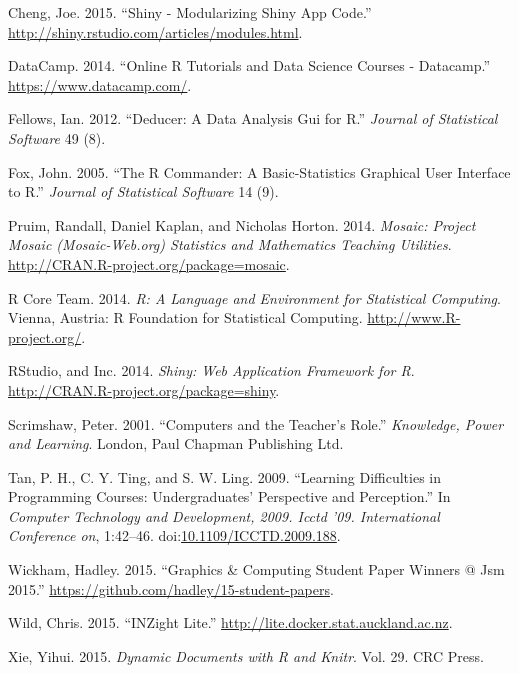 \documentclass[12pt,]{article}
\begin{document}
\hypertarget{ref-shinymodules}{}
Cheng, Joe. 2015. ``Shiny - Modularizing Shiny App Code.''
\url{http://shiny.rstudio.com/articles/modules.html}.

\hypertarget{ref-datacamp}{}
DataCamp. 2014. ``Online R Tutorials and Data Science Courses -
Datacamp.'' \url{https://www.datacamp.com/}.

\hypertarget{ref-fellows2012}{}
Fellows, Ian. 2012. ``Deducer: A Data Analysis Gui for R.''
\emph{Journal of Statistical Software} 49 (8).

\hypertarget{ref-fox2005}{}
Fox, John. 2005. ``The R Commander: A Basic-Statistics Graphical User
Interface to R.'' \emph{Journal of Statistical Software} 14 (9).

\hypertarget{ref-mosaic}{}
Pruim, Randall, Daniel Kaplan, and Nicholas Horton. 2014. \emph{Mosaic:
Project Mosaic (Mosaic-Web.org) Statistics and Mathematics Teaching
Utilities}. \url{http://CRAN.R-project.org/package=mosaic}.

\hypertarget{ref-r-stat}{}
R Core Team. 2014. \emph{R: A Language and Environment for Statistical
Computing}. Vienna, Austria: R Foundation for Statistical Computing.
\url{http://www.R-project.org/}.

\hypertarget{ref-shiny}{}
RStudio, and Inc. 2014. \emph{Shiny: Web Application Framework for R}.
\url{http://CRAN.R-project.org/package=shiny}.

\hypertarget{ref-scrimshaw2001computers}{}
Scrimshaw, Peter. 2001. ``Computers and the Teacher's Role.''
\emph{Knowledge, Power and Learning}. London, Paul Chapman Publishing
Ltd.

\hypertarget{ref-5359977}{}
Tan, P. H., C. Y. Ting, and S. W. Ling. 2009. ``Learning Difficulties in
Programming Courses: Undergraduates' Perspective and Perception.'' In
\emph{Computer Technology and Development, 2009. Icctd '09.
International Conference on}, 1:42--46.
doi:\href{https://doi.org/10.1109/ICCTD.2009.188}{10.1109/ICCTD.2009.188}.

\hypertarget{ref-interpolate}{}
Wickham, Hadley. 2015. ``Graphics \& Computing Student Paper Winners @
Jsm 2015.'' \url{https://github.com/hadley/15-student-papers}.

\hypertarget{ref-inzight}{}
Wild, Chris. 2015. ``INZight Lite.''
\url{http://lite.docker.stat.auckland.ac.nz}.

\hypertarget{ref-xie2015}{}
Xie, Yihui. 2015. \emph{Dynamic Documents with R and Knitr}. Vol. 29.
CRC Press.
\end{document}
